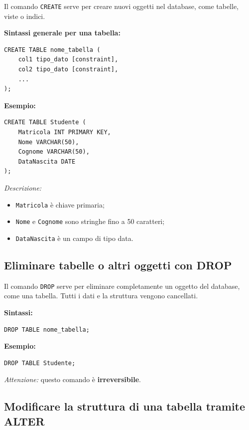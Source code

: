 \documentclass[a4paper,12pt]{article}
\newcommand{\code}[1]{\texttt{#1}}
\begin{document}
Il comando \code{CREATE} serve per creare nuovi oggetti nel database, come tabelle, viste o indici. 

\textbf{Sintassi generale per una tabella:}
\begin{verbatim}
CREATE TABLE nome_tabella (
    col1 tipo_dato [constraint],
    col2 tipo_dato [constraint],
    ...
);
\end{verbatim}

\textbf{Esempio:}

\begin{verbatim}
CREATE TABLE Studente (
    Matricola INT PRIMARY KEY,
    Nome VARCHAR(50),
    Cognome VARCHAR(50),
    DataNascita DATE
);
\end{verbatim}

\textit{Descrizione:}  
\begin{itemize}
    \item \code{Matricola} è chiave primaria;
    \item \code{Nome} e \code{Cognome} sono stringhe fino a 50 caratteri;
    \item \code{DataNascita} è un campo di tipo data.
\end{itemize}

\subsection{Eliminare tabelle o altri oggetti con DROP}

Il comando \code{DROP} serve per eliminare completamente un oggetto del database, come una tabella. Tutti i dati e la struttura vengono cancellati. 

\textbf{Sintassi:}
\begin{verbatim}
DROP TABLE nome_tabella;
\end{verbatim}

\textbf{Esempio:}

\begin{verbatim}
DROP TABLE Studente;
\end{verbatim}

\textit{Attenzione:} questo comando è \textbf{irreversibile}.

\subsection{Modificare la struttura di una tabella tramite ALTER}
\end{document}
